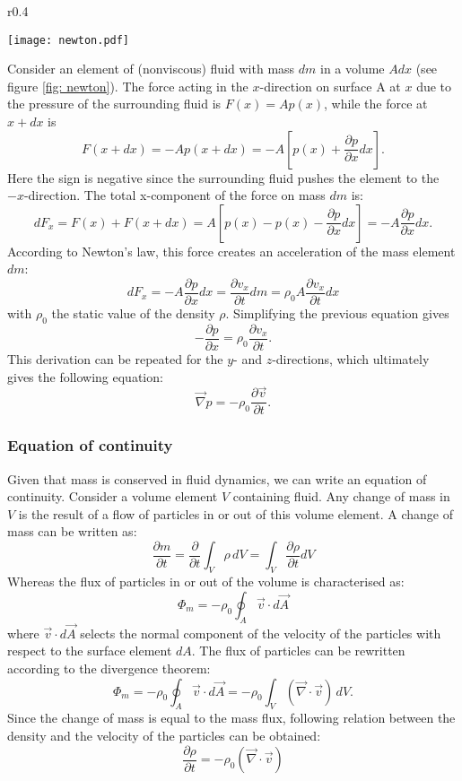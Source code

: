 \begin{wrapfigure}{r}{0.4\textwidth}
	\vspace{-10pt}
  \begin{center}
    \texttt{[image: newton.pdf]}
  \end{center}
  \caption{}\label{fig: newton}
  \vspace{-20pt}
\end{wrapfigure}

Consider an element of (nonviscous) fluid with mass $dm$ in a volume $A dx$ (see figure \ref{fig: newton}). The force acting in the $x$-direction on surface A at $x$ due to the pressure of the surrounding fluid  is $F(x) = A p(x) $, while the force at $x +dx$ is 
\[
F(x+dx) = - A p(x+dx) = -A [p(x) + \frac{\partial p}{\partial x} dx].
\]
Here the sign is negative since the surrounding fluid pushes the element to the $-x$-direction.
The total x-component of the force on mass $dm$ is:
\[
dF_x = F(x) + F(x+dx) = A [p(x) - p(x) - \frac{\partial p}{\partial x} dx] = - A \frac{\partial p}{\partial x} dx.
\]  
According to Newton's law, this force creates an acceleration of the mass element $dm$:
\[
dF_x = - A \frac{\partial p}{\partial x} dx = \frac{\partial v_x}{\partial t} dm = \rho_0 A \frac{\partial v_x}{\partial t} dx
\]
with $\rho_0$ the static value of the density $\rho$. Simplifying the previous equation gives
\[
- \frac{\partial p}{\partial x} = \rho_0 \frac{\partial v_x}{\partial t}.
\]
This derivation can be repeated for the $y$- and $z$-directions, which ultimately gives the following equation:
\begin{equation}
\vec{\nabla} p = - \rho_0 \frac{\partial \vec{v}}{\partial t}.
\label{newt}
\end{equation}


\subsubsection*{Equation of continuity}
\vspace{-15pt}
Given that mass is conserved in fluid dynamics, we can write an equation of continuity. Consider a volume element $V$ containing fluid. Any change of mass in $V$ is the result of a flow of particles in or out of this volume element. A change of mass can be written as:
\[
\frac{\partial m}{\partial t} = \frac{\partial }{\partial t} \int_{V} \rho \,dV =\int_{V} \frac{\partial \rho}{\partial t} dV
\]
Whereas the flux of particles in or out of the volume is characterised as:
\[
\Phi_m = - \rho_0 \oint_A \vec{v} \cdot d\vec{A}
\]
where $\vec{v} \cdot d\vec{A}$ selects the normal component of the velocity of the particles with respect to the surface element $dA$.
The flux of particles can be rewritten according to the divergence theorem:
\[
\Phi_m = - \rho_0 \oint_A \vec{v} \cdot d\vec{A} =- \rho_0 \int_{V} (\vec{\nabla} \cdot \vec{v}) \, dV.
\]
Since the change of mass is equal to the mass flux, following relation between the density and the velocity of the particles can be obtained:
\begin{equation}
\frac{\partial \rho}{\partial t}  = - \rho_0 (\vec{\nabla} \cdot \vec{v})
\label{cont}
\end{equation}


